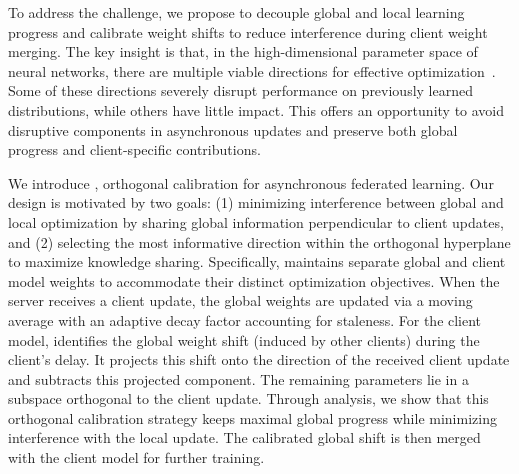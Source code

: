 To address the challenge, we propose to decouple global and local learning progress and calibrate weight shifts to reduce interference during client weight merging. The key insight is that, in the high-dimensional parameter space of neural networks, there are multiple viable directions for effective optimization~\cite{wortsman2021learning}. Some of these directions severely disrupt performance on previously learned distributions, while others have little impact. This offers an opportunity to avoid disruptive components in asynchronous updates and preserve both global progress and client-specific contributions.

We introduce \our, orthogonal calibration for asynchronous federated learning. Our design is motivated by two goals: (1) minimizing interference between global and local optimization by sharing global information perpendicular to client updates, and (2) selecting the most informative direction within the orthogonal hyperplane to maximize knowledge sharing. Specifically, \our maintains separate global and client model weights to accommodate their distinct optimization objectives. When the server receives a client update, the global weights are updated via a moving average with an adaptive decay factor accounting for staleness. For the client model, \our identifies the global weight shift (induced by other clients) during the client's delay. It projects this shift onto the direction of the received client update and subtracts this projected component. The remaining parameters lie in a subspace orthogonal to the client update. Through analysis, we show that this orthogonal calibration strategy keeps maximal global progress while minimizing interference with the local update. The calibrated global shift is then merged with the client model for further training. 

